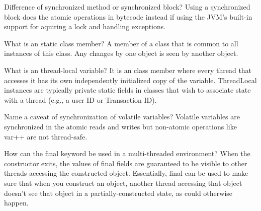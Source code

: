 \documentclass[avery5371,grid]{flashcards}
\begin{document}
\begin{flashcard}[Concurrency]{Difference of synchronized method or synchronized block?}
Using a synchronized block does the atomic operations in bytecode instead if using the JVM's built-in support for aquiring a lock and handling exceptions.
\end{flashcard}

\begin{flashcard}[Classes]{What is an static class member?}
A member of a class that is common to all instances of this class. Any changes by one object is seen by another object.
\end{flashcard}

\begin{flashcard}[Concurrency]{What is an thread-local variable?}
It is an class member where every thread that accesses it has its own independently initialized copy of the variable. ThreadLocal instances are typically private static fields in classes that wish to associate state with a thread (e.g., a user ID or Transaction ID).
\end{flashcard}

\begin{flashcard}[Concurrency]{Name a caveat of synchronization of volatile variables?}
Volatile variables are synchronized in the atomic reads and writes but non-atomic operations like var++ are not thread-safe.
\end{flashcard}

\begin{flashcard}[Concurrency]{How can the final keyword be used in a multi-threaded environment?}
When the constructor exits, the values of final fields are guaranteed to be visible to other threads accessing the constructed object. Essentially, final can be used to make sure that when you construct an object, another thread accessing that object doesn't see that object in a partially-constructed state, as could otherwise happen.
\end{flashcard}
\end{document}
